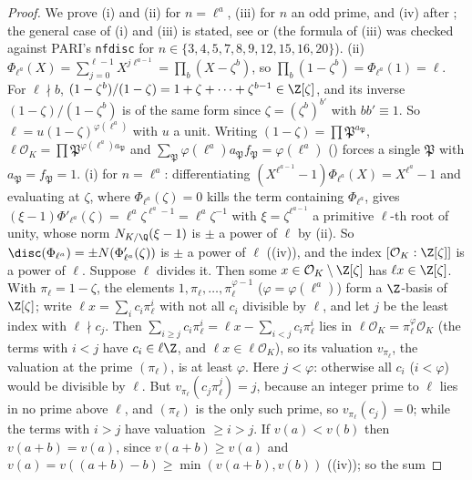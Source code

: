 \begin{proof}
We prove (i) and (ii) for $n=\ell^a$, (iii) for $n$ an odd prime, and (iv) after ; the general case of (i) and (iii)
is stated, see \cite[Chapter 2]{Washington} or \cite[Chapter I, Section 10]{Neukirch} (the formula of (iii) was checked against PARI's \texttt{nfdisc} for
$n\in\{3,4,5,7,8,9,12,15,16,20\}$). (ii) $\Phi_{\ell^a}(X)=\sum_{j=0}^{\ell-1}X^{j\ell^{a-1}}=\prod_b(X-\zeta^b)$, so $\prod_b(1-\zeta^b)=\Phi_{\ell^a}(1)=\ell$. For
$\ell\nmid b$, $(1-\zeta^b)/(1-\zeta)=1+\zeta+\dots+\zeta^{b-1}\in\Z[\zeta]$, and its inverse $(1-\zeta)/(1-\zeta^b)$ is of the same form since $\zeta=(\zeta^b)^{b'}$ with
$bb'\equiv1$. So $\ell=u(1-\zeta)^{\varphi(\ell^a)}$ with $u$ a unit. Writing $(1-\zeta)=\prod\mathfrak P^{a_{\mathfrak P}}$, $\ell\mathcal O_K=\prod\mathfrak P^{\varphi(\ell^a)a_{\mathfrak P}}$
and $\sum_{\mathfrak P}\varphi(\ell^a)a_{\mathfrak P}f_{\mathfrak P}=\varphi(\ell^a)$ () forces a single $\mathfrak P$ with $a_{\mathfrak P}=f_{\mathfrak P}=1$.
(i) for $n=\ell^a$: differentiating $(X^{\ell^{a-1}}-1)\Phi_{\ell^a}(X)=X^{\ell^a}-1$ and evaluating at $\zeta$, where $\Phi_{\ell^a}(\zeta)=0$ kills the term
containing $\Phi_{\ell^a}$, gives $(\xi-1)\Phi'_{\ell^a}(\zeta)=\ell^a\zeta^{\ell^a-1}=\ell^a\zeta^{-1}$ with $\xi=\zeta^{\ell^{a-1}}$ a primitive $\ell$-th
root of unity, whose norm $N_{K/\Q}(\xi-1)$ is $\pm$ a power of $\ell$ by (ii). So $\disc(\Phi_{\ell^a})=\pm N(\Phi'_{\ell^a}(\zeta))$ is $\pm$ a power of $\ell$
((iv)), and the index $[\mathcal O_K:\Z[\zeta]]$ is a power of $\ell$. Suppose $\ell$ divides it. Then some $x\in\mathcal O_K\setminus\Z[\zeta]$
has $\ell x\in\Z[\zeta]$. With $\pi_\ell=1-\zeta$, the elements $1,\pi_\ell,\dots,\pi_\ell^{\varphi-1}$ ($\varphi=\varphi(\ell^a)$) form a $\Z$-basis of $\Z[\zeta]$; write
$\ell x=\sum_ic_i\pi_\ell^i$ with not all $c_i$ divisible by $\ell$, and let $j$ be the least index with $\ell\nmid c_j$. Then $\sum_{i\ge j}c_i\pi_\ell^i=\ell x-\sum_{i<j}c_i\pi_\ell^i$
lies in $\ell\mathcal O_K=\pi_\ell^\varphi\mathcal O_K$ (the terms with $i<j$ have $c_i\in\ell\Z$, and $\ell x\in\ell\mathcal O_K$), so its valuation $v_{\pi_\ell}$,
the valuation at the prime $(\pi_\ell)$, is at least $\varphi$. Here $j<\varphi$: otherwise all $c_i$ ($i<\varphi$) would be divisible by $\ell$. But
$v_{\pi_\ell}(c_j\pi_\ell^j)=j$, because an integer prime to $\ell$ lies in no prime above $\ell$, and $(\pi_\ell)$ is the only such prime, so $v_{\pi_\ell}(c_j)=0$;
while the terms with $i>j$ have valuation $\ge i>j$. If $v(a)<v(b)$ then $v(a+b)=v(a)$, since $v(a+b)\ge v(a)$ and $v(a)=v((a+b)-b)\ge\min(v(a+b),v(b))$ ((iv)); so the sum

\end{proof}
